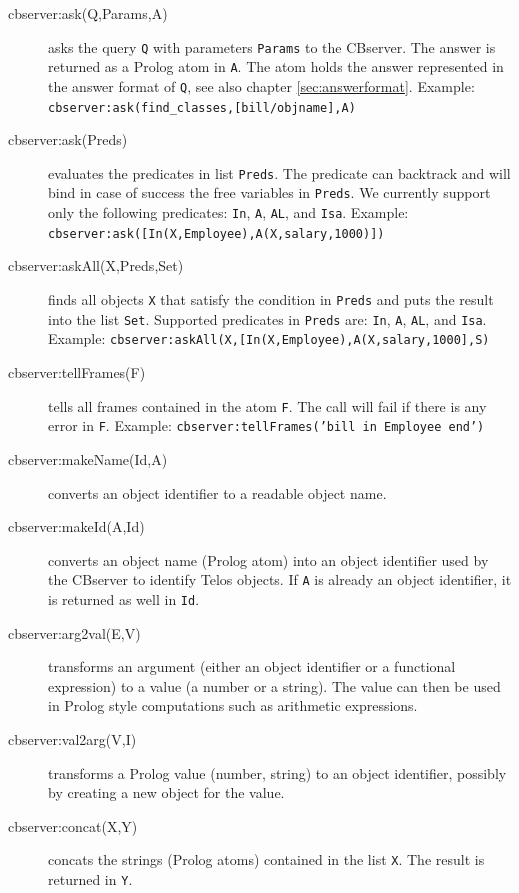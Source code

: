 \begin{description}

\item[cbserver:ask(Q,Params,A)] asks the query {\tt Q} with 
parameters {\tt Params} to the CBserver. The answer is returned as
a Prolog atom in {\tt A}. The atom holds the answer represented
in the answer format of {\tt Q}, see also chapter \ref{sec:answerformat}. \newline
Example: {\tt cbserver:ask(find\_classes,[bill/objname],A)}

\item[cbserver:ask(Preds)] evaluates the predicates in list {\tt Preds}. The 
predicate can backtrack and will bind in case of success the free variables
in {\tt Preds}. We currently support only the following predicates: {\tt In}, 
{\tt A}, {\tt AL}, and {\tt Isa}.\newline
Example: {\tt cbserver:ask([In(X,Employee),A(X,salary,1000)])}

\item[cbserver:askAll(X,Preds,Set)] finds all objects {\tt X} that satisfy
the condition in {\tt Preds} and puts the result into the list {\tt Set}. 
Supported predicates in {\tt Preds} are:  {\tt In}, {\tt A}, {\tt AL}, and {\tt Isa}.\newline
Example: {\tt cbserver:askAll(X,[In(X,Employee),A(X,salary,1000],S)}

\item[cbserver:tellFrames(F)] tells all frames contained in the atom {\tt F}.
The call will fail if there is any error in {\tt F}.\newline
Example: {\tt cbserver:tellFrames('bill in Employee end')}

\item[cbserver:makeName(Id,A)] converts an object identifier to a readable
object name.

\item[cbserver:makeId(A,Id)] converts an object name (Prolog atom) into
an object identifier used by the CBserver to identify Telos objects.
If {\tt A} is already an object identifier, it is returned as well
in {\tt Id}.

\item[cbserver:arg2val(E,V)] transforms an argument (either an object identifier
or a functional expression) to a value (a number or a string). The value can then
be used  in Prolog style computations such as arithmetic expressions.

\item[cbserver:val2arg(V,I)] transforms a Prolog value (number, string) to an
object identifier, possibly by creating a new object for the value. 

\item[cbserver:concat(X,Y)] concats the strings (Prolog atoms) contained
in the list {\tt X}. The result is returned in {\tt Y}.

\end{description}

